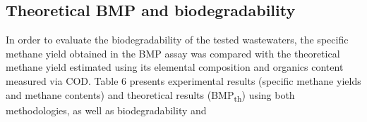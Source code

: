 \subsection{Theoretical BMP and biodegradability}
In order to evaluate the biodegradability of the tested wastewaters, the specific methane yield obtained in the BMP assay was compared with the theoretical methane yield estimated using its elemental composition and organics content measured via COD. Table 6 presents experimental results (specific methane yields and methane contents) and theoretical results (BMP\textsubscript{th}) using both methodologies, as well as biodegradability and 
